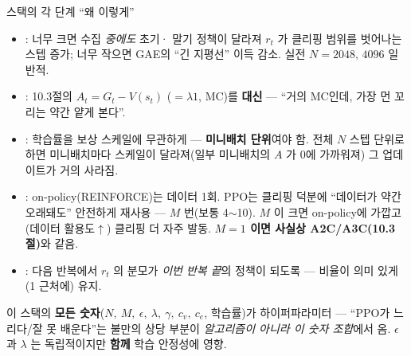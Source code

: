 \documentclass[aspectratio=169,11pt]{beamer}
\begin{document}

\begin{frame}{스택의 각 단계 ``왜 이렇게''}
  \small
  \begin{itemize}
    \item {}: 너무 크면 수집 \textit{중에도} 초기·
      말기 정책이 달라져 $r_t$ 가 클리핑 범위를 벗어나는 스텝
      증가; 너무 작으면 GAE의 ``긴 지평선'' 이득 감소.
      실전 $N=2048,\,4096$ 일반적.
    \item \kb{③ GAE($\lambda=0.95$)}: 10.3절의
      $A_t=G_t-V(s_t)$ ($=\lambda1$, MC)를 \textbf{대신} —
      ``거의 MC인데, 가장 먼 꼬리는 약간 얕게 본다''.
    \item \kb{④ 정규화}: 학습률을 보상 스케일에 무관하게 —
      \textbf{미니배치 단위}여야 함. 전체 $N$ 스텝 단위로 하면
      미니배치마다 스케일이 달라져(일부 미니배치의 $A$ 가 0에
      가까워져) 그 업데이트가 거의 사라짐.
    \item \kb{⑤ $M$ epochs}: on-policy(REINFORCE)는 데이터 1회.
      PPO는 클리핑 덕분에 ``데이터가 약간 오래돼도'' 안전하게
      재사용 — $M$ 번(보통 4$\sim$10). $M$ 이 크면 on-policy에
      가깝고(데이터 활용도$\uparrow$) 클리핑 더 자주 발동.
      \textbf{$M=1$ 이면 사실상 A2C/A3C(10.3절)}와 같음.
    \item {}: 다음 반복에서
      $r_t$ 의 분모가 \textit{이번 반복 끝}의 정책이 되도록 —
      비율이 의미 있게 (1 근처에) 유지.
  \end{itemize}
  {\footnotesize 이 스택의 \textbf{모든 숫자}($N,\ M,\ \epsilon,\
  \lambda,\ \gamma,\ c_v,\ c_e$, 학습률)가 하이퍼파라미터 —
  ``PPO가 느리다/잘 못 배운다''는 불만의 상당 부분이
  \textit{알고리즘이 아니라 이 숫자 조합}에서 옴.
  $\epsilon$ 과 $\lambda$ 는 독립적이지만 \textbf{함께}
  학습 안정성에 영향.}
\end{frame}
\end{document}
